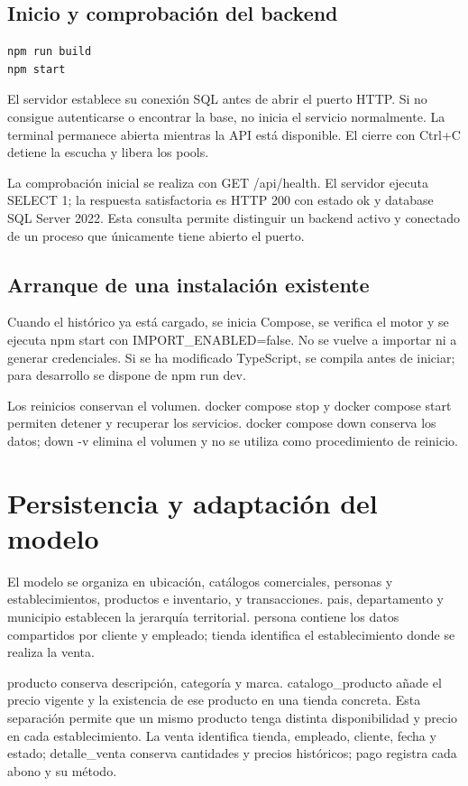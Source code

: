 \subsection{Inicio y comprobación del backend}
\begin{lstlisting}
npm run build
npm start
\end{lstlisting}
El servidor establece su conexión SQL antes de abrir el puerto HTTP. Si no consigue autenticarse o encontrar la base, no inicia el servicio normalmente. La terminal permanece abierta mientras la API está disponible. El cierre con Ctrl+C detiene la escucha y libera los pools.

La comprobación inicial se realiza con GET /api/health. El servidor ejecuta SELECT 1; la respuesta satisfactoria es HTTP 200 con estado ok y database SQL Server 2022. Esta consulta permite distinguir un backend activo y conectado de un proceso que únicamente tiene abierto el puerto.


\subsection{Arranque de una instalación existente}
Cuando el histórico ya está cargado, se inicia Compose, se verifica el motor y se ejecuta npm start con IMPORT\_ENABLED=false. No se vuelve a importar ni a generar credenciales. Si se ha modificado TypeScript, se compila antes de iniciar; para desarrollo se dispone de npm run dev.

Los reinicios conservan el volumen. docker compose stop y docker compose start permiten detener y recuperar los servicios. docker compose down conserva los datos; down -v elimina el volumen y no se utiliza como procedimiento de reinicio.

\section{Persistencia y adaptación del modelo}
El modelo se organiza en ubicación, catálogos comerciales, personas y establecimientos, productos e inventario, y transacciones. pais, departamento y municipio establecen la jerarquía territorial. persona contiene los datos compartidos por cliente y empleado; tienda identifica el establecimiento donde se realiza la venta.

producto conserva descripción, categoría y marca. catalogo\_producto añade el precio vigente y la existencia de ese producto en una tienda concreta. Esta separación permite que un mismo producto tenga distinta disponibilidad y precio en cada establecimiento. La venta identifica tienda, empleado, cliente, fecha y estado; detalle\_venta conserva cantidades y precios históricos; pago registra cada abono y su método.

